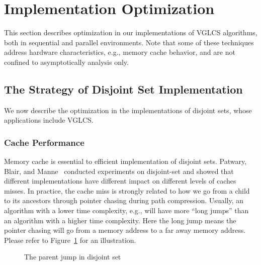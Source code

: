 \section{Implementation Optimization} \label{sec:Implementation}

This section describes optimization in our implementations of VGLCS
algorithms, both in sequential and parallel environments.  Note that
some of these techniques address hardware characteristics, e.g.,
memory cache behavior, and are not confined to asymptotically analysis
only.

\subsection{The Strategy of Disjoint Set Implementation}

We now describe the optimization in the implementations of disjoint
sets, whose applications include VGLCS.


\subsubsection{Cache Performance}

Memory cache is essential to efficient implementation of disjoint
sets.  Patwary, Blair, and Manne~\cite{Patwary2010ExperimentsOU}
conducted experiments on disjoint-set and showed that different
implementations have different impact on different levels of caches
misses.  In practice, the cache miss is strongly related to how we go
from a child to its ancestors through pointer chasing during path
compression.  Usually, an algorithm with a lower time complexity,
e.g., will have more ``long jumps'' than an algorithm with a higher
time complexity.  Here the long jump means the pointer chasing will go
from a memory address to a far away memory address.  Please refer to
Figure~\ref{fig:long-short-jump-disjoint} for an illustration.

\begin{figure}[!thb]
  \centering {} 
  \caption{The parent jump in disjoint set}
  \label{fig:long-short-jump-disjoint}
\end{figure}

